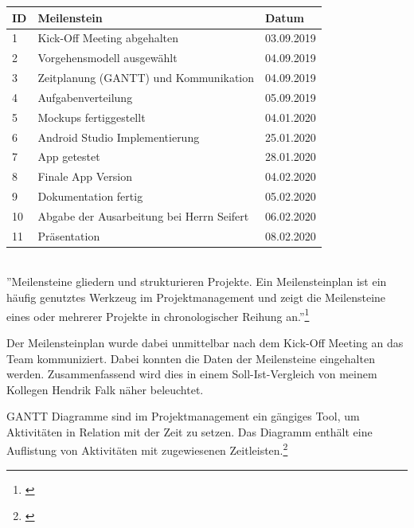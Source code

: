 \begin{tabularx}{\textwidth}{|p{2em}|X|p{5em}|}
\hline
\textbf{ID} & \textbf{Meilenstein} & \textbf{Datum} 
\\ \hline \hline
1 &Kick-Off Meeting abgehalten &	03.09.2019
\\ \hline
2&	Vorgehensmodell ausgewählt&	04.09.2019
\\ \hline
3&	Zeitplanung (GANTT) und Kommunikation&	04.09.2019
\\ \hline
4&	Aufgabenverteilung	&05.09.2019
\\ \hline
5&	Mockups fertiggestellt&	04.01.2020
\\ \hline
6&	Android Studio Implementierung&	25.01.2020
\\ \hline
7&	App getestet&	28.01.2020
\\ \hline
8&	Finale App Version&	04.02.2020
\\ \hline
9&	Dokumentation fertig&	05.02.2020
\\ \hline
10&	Abgabe der Ausarbeitung bei Herrn Seifert&	06.02.2020
\\ \hline
11&	Präsentation&	08.02.2020
\\ \hline
\end{tabularx}
\vspace{1em}
\\
''Meilensteine gliedern und strukturieren Projekte. Ein Meilensteinplan ist ein häufig genutztes Werkzeug im Projektmanagement und zeigt die Meilensteine eines oder mehrerer Projekte in chronologischer Reihung an.''\footnote{\cite[][]{t2informatik}}

Der Meilensteinplan wurde dabei unmittelbar nach dem Kick-Off Meeting an das Team kommuniziert. Dabei konnten die Daten der Meilensteine eingehalten werden. Zusammenfassend wird dies in einem Soll-Ist-Vergleich von meinem Kollegen Hendrik Falk näher beleuchtet.

GANTT Diagramme sind im Projektmanagement ein gängiges Tool, um Aktivitäten in Relation mit der Zeit zu setzen. Das Diagramm enthält eine Auflistung von Aktivitäten mit zugewiesenen Zeitleisten.\footnote{\cite[vgl.][]{ganttGentgesxy2001a}}

\clearpage


\enlargethispage{3\baselineskip}

